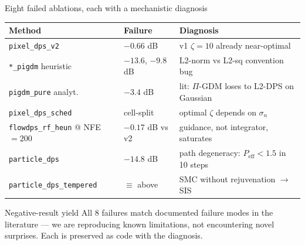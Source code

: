 \documentclass[10pt,aspectratio=169]{beamer}
\begin{document}
\begin{frame}{Eight failed ablations, each with a mechanistic diagnosis}
  \begin{table}
    \centering
    \footnotesize
    \begin{tabular}{lll}
      \toprule
      Method & Failure & Diagnosis \\
      \midrule
      \texttt{pixel\_dps\_v2}      & $-0.66$ dB & v1 $\zeta{=}10$ already near-optimal \\
      \texttt{*\_pigdm} heuristic  & $-13.6$, $-9.8$ dB & L2-norm vs L2-sq convention bug \\
      \texttt{pigdm\_pure} analyt. & $-3.4$ dB & lit: $\Pi$-GDM loses to L2-DPS on Gaussian \\
      \texttt{pixel\_dps\_sched}   & cell-split & optimal $\zeta$ depends on $\sigma_n$ \\
      \texttt{flowdps\_rf\_heun} @ NFE${=}200$ & $-0.17$ dB vs v2 & guidance, not integrator, saturates \\
      \texttt{particle\_dps}       & $-14.8$ dB & path degeneracy: $P_{\mathrm{eff}}{<}1.5$ in 10 steps \\
      \texttt{particle\_dps\_tempered} & $\equiv$ above & SMC without rejuvenation $\to$ SIS \\
      \bottomrule
    \end{tabular}
  \end{table}

  \begin{block}{Negative-result yield}
    All 8 failures match documented failure modes in the literature ---
    we are reproducing known limitations, not encountering novel
    surprises. Each is preserved as code with the diagnosis.
  \end{block}

\end{frame}
\end{document}
